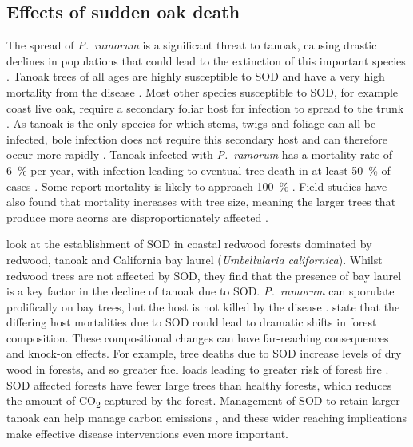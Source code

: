 \subsection{Effects of sudden oak death}

The spread of \textit{P.~ramorum} is a significant threat to tanoak, causing drastic declines in populations that could lead to the extinction of this important species \citep{mcpherson_responses_2010}. Tanoak trees of all ages are highly susceptible to SOD and have a very high mortality from the disease \citep{davis_preimpact_2010}. Most other species susceptible to SOD, for example coast live oak, require a secondary foliar host for infection to spread to the trunk \citep{rizzo_phytophthora_2005}. As tanoak is the only species for which stems, twigs and foliage can all be infected, bole infection does not require this secondary host and can therefore occur more rapidly \citep{rizzo_sudden_2003}. Tanoak infected with \textit{P.~ramorum} has a mortality rate of \SI{6}{\percent} per year, with infection leading to eventual tree death in at least \SI{50}{\percent} of cases \citep{mcpherson_responses_2010}. Some report mortality is likely to approach \SI{100}{\percent} \citep{ramage_sudden_2010}. Field studies have also found that mortality increases with tree size, meaning the larger trees that produce more acorns are disproportionately affected \citep{cobb_ecosystem_2012}.

\citet{maloney_establishment_2005} look at the establishment of SOD in coastal redwood forests dominated by redwood, tanoak and California bay laurel (\textit{Umbellularia californica}). Whilst redwood trees are not affected by SOD, they find that the presence of bay laurel is a key factor in the decline of tanoak due to SOD\@. \textit{P.~ramorum} can sporulate prolifically on bay trees, but the host is not killed by the disease \citep{davidson_sources_2008}. \citet{maloney_establishment_2005} state that the differing host mortalities due to SOD could lead to dramatic shifts in forest composition. These compositional changes can have far-reaching consequences and knock-on effects. For example, tree deaths due to SOD increase levels of dry wood in forests, and so greater fuel loads leading to greater risk of forest fire \citep{forrestel_disease_2015}. SOD affected forests have fewer large trees than healthy forests, which reduces the amount of CO\textsubscript{2} captured by the forest. Management of SOD to retain larger tanoak can help manage carbon emissions \citep{twieg_reducing_2017}, and these wider reaching implications make effective disease interventions even more important.

